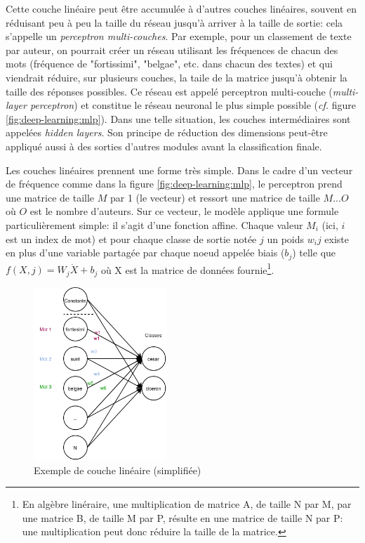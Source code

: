 Cette couche linéaire peut être accumulée à d'autres couches linéaires, souvent en réduisant peu à peu la taille du réseau jusqu'à arriver à la taille de sortie: cela s'appelle un \textit{perceptron multi-couches}. Par exemple, pour un classement de texte par auteur, on pourrait créer un réseau utilisant les fréquences de chacun des mots (fréquence de "fortissimi", "belgae", etc. dans chacun des textes) et qui viendrait réduire, sur plusieurs couches, la taile de la matrice jusqu'à obtenir la taille des réponses possibles. Ce réseau est appelé perceptron multi-couche (\textit{multi-layer perceptron}) et constitue le réseau neuronal le plus simple possible (\textit{cf.} figure \ref{fig:deep-learning:mlp}). Dans une telle situation, les couches intermédiaires sont appelées \textit{hidden layers}. Son principe de réduction des dimensions peut-être appliqué aussi à des sorties d'autres modules avant la classification finale.

Les couches linéaires prennent une forme très simple. Dans le cadre d'un vecteur de fréquence comme dans la figure \ref{fig:deep-learning:mlp}, le perceptron prend une matrice de taille $M$ par 1 (le vecteur) et ressort une matrice de taille $M...O$ où $O$ est le nombre d'auteurs. Sur ce vecteur, le modèle applique une formule particulièrement simple: il s'agit d'une fonction affine. Chaque valeur $M_{i}$ (ici, $i$ est un index de mot) et pour chaque classe de sortie notée $j$  un poids $w_{i}{j}$ existe en plus d'une variable partagée par chaque noeud appelée biais ($b_{j}$) telle que $f(X, j) = W_{j} \dot X + b_{j}$  où X est la matrice de données fournie\footnote{En algèbre linéraire, une multiplication de matrice A, de taille N par M, par une matrice B, de taille M par P, résulte en une matrice de taille N par P: une multiplication peut donc réduire la taille de la matrice.}.

\begin{figure}
    \centering
    \includegraphics[width=5cm]{results/deep-learning/explanations/SimpleLinear.png}
    \caption{Exemple de couche linéaire (simplifiée)}
    \label{fig:deep-learning:simple-linear}
\end{figure}

